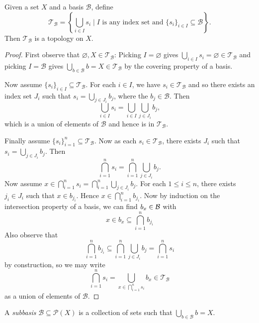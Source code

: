 \begin{theorem}
  Given a set $X$ and a basis $\mathcal{B}$, define
  \[
    \mathcal{T}_\mathcal{B} = \left\{\bigcup_{i \in I} s_i \mid \text{$I$ is any index set and $\{s_i\}_{i \in I} \subseteq \mathcal{B}$}\right\}.
  \]
  Then $\mathcal{T}_\mathcal{B}$ is a topology on $X$.
\end{theorem}

\begin{proof}
  First observe that $\varnothing, X \in \mathcal{T}_\mathcal{B}$:
  Picking $I = \varnothing$ gives
  $\bigcup_{i \in I} s_i = \varnothing \in \mathcal{T}_\mathcal{B}$
  and picking $I = \mathcal{B}$ gives
  $\bigcup_{b \in \mathcal{B}} b = X \in \mathcal{T}_\mathcal{B}$
  by the covering property of a basis.

  Now assume $\{s_i\}_{i \in I} \subseteq \mathcal{T}_\mathcal{B}$.
  For each $i \in I$, we have $s_i \in \mathcal{T}_\mathcal{B}$
  and so there exists an index set $J_i$
  such that $s_i = \bigcup_{j \in J_i} b_j$, where
  the $b_j \in \mathcal{B}$. Then
  \[
    \bigcup_{i \in I} s_i = \bigcup_{i \in I} \bigcup_{j \in J_i} b_j,
  \]
  which is a union of elements of
  $\mathcal{B}$ and hence is in
  $\mathcal{T}_{\mathcal{B}}$.

  Finally assume $\{s_i\}_{i = 1}^n \subseteq \mathcal{T}_\mathcal{B}$.
  Now as each $s_i \in \mathcal{T}_\mathcal{B}$,
  there exists $J_i$ such that
  $s_i = \bigcup_{j \in J_i} b_j$.
  Then
  \[
    \bigcap_{i = 1}^n s_i = \bigcap_{i = 1}^n \bigcup_{j \in J_i} b_j.
  \]
  Now assume $x \in \bigcap_{i = 1}^n s_i = \bigcap_{i = 1}^n \bigcup_{j \in J_i} b_j$.
  For each $1 \le i \le n$, there exists
  $j_i \in J_i$ such that $x \in b_{j_i}$.
  Hence $x \in \bigcap_{i = 1}^n b_{j_i}$.
  Now by induction on the intersection property of a basis,
  we can find $b_x \in \mathcal{B}$ with
  \[
    x \in b_x \subseteq \bigcap_{i = 1}^n b_{j_i}
  \]
  Also observe that
  \[\bigcap_{i = 1}^n b_{j_i} \subseteq \bigcap_{i = 1}^n \bigcup_{j \in J_i} b_j
    = \bigcap_{i = 1}^n s_i
  \]
  by construction,
  so we may write
  \[
    \bigcap_{i = 1}^n s_i = \bigcup_{x \in \bigcap_{i = 1}^n s_i} b_x \in \mathcal{T}_\mathcal{B}
  \]
  as a union of elements of $\mathcal{B}$.
\end{proof}

\begin{definition}
  A \emph{subbasis} $\mathcal{B} \subseteq \mathcal{P}(X)$ is a collection
  of sets such that
  $\bigcup_{b \in \mathcal{B}} b = X$.
\end{definition}

